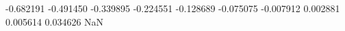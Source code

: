 -0.682191
-0.491450
-0.339895
-0.224551
-0.128689
-0.075075
-0.007912
0.002881
0.005614
0.034626
NaN
